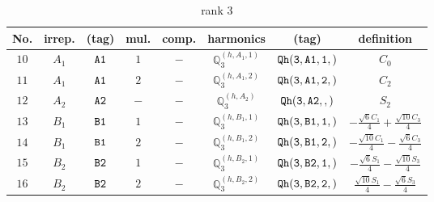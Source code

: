 \documentclass[fleqn,8pt]{jsarticle}
\begin{document}
\begin{table}[ht!]
\begin{center}
\caption{rank 3}
\renewcommand{\arraystretch}{1.3}
\begin{tabular}{cccccccc} \hline \hline
No. & irrep. & (tag) & mul. & comp. & harmonics & (tag) & definition \\ \hline
$ 10 $ & $ A_{1} $ & $ {\tt A1} $ & $ 1 $ & $ - $ & $ \mathbb{Q}_{3}^{(h,A_{1},1)} $ & $ {\tt Qh(3,A1,1,)} $ & $ C_{0} $ \\
$ 11 $ & $ A_{1} $ & $ {\tt A1} $ & $ 2 $ & $ - $ & $ \mathbb{Q}_{3}^{(h,A_{1},2)} $ & $ {\tt Qh(3,A1,2,)} $ & $ C_{2} $ \\
$ 12 $ & $ A_{2} $ & $ {\tt A2} $ & $ - $ & $ - $ & $ \mathbb{Q}_{3}^{(h,A_{2})} $ & $ {\tt Qh(3,A2,,)} $ & $ S_{2} $ \\
$ 13 $ & $ B_{1} $ & $ {\tt B1} $ & $ 1 $ & $ - $ & $ \mathbb{Q}_{3}^{(h,B_{1},1)} $ & $ {\tt Qh(3,B1,1,)} $ & $ - \frac{\sqrt{6} C_{1}}{4} + \frac{\sqrt{10} C_{3}}{4} $ \\
$ 14 $ & $ B_{1} $ & $ {\tt B1} $ & $ 2 $ & $ - $ & $ \mathbb{Q}_{3}^{(h,B_{1},2)} $ & $ {\tt Qh(3,B1,2,)} $ & $ - \frac{\sqrt{10} C_{1}}{4} - \frac{\sqrt{6} C_{3}}{4} $ \\
$ 15 $ & $ B_{2} $ & $ {\tt B2} $ & $ 1 $ & $ - $ & $ \mathbb{Q}_{3}^{(h,B_{2},1)} $ & $ {\tt Qh(3,B2,1,)} $ & $ - \frac{\sqrt{6} S_{1}}{4} - \frac{\sqrt{10} S_{3}}{4} $ \\
$ 16 $ & $ B_{2} $ & $ {\tt B2} $ & $ 2 $ & $ - $ & $ \mathbb{Q}_{3}^{(h,B_{2},2)} $ & $ {\tt Qh(3,B2,2,)} $ & $ \frac{\sqrt{10} S_{1}}{4} - \frac{\sqrt{6} S_{3}}{4} $ \\
 \hline \hline
\end{tabular}
\end{center}
\end{table}
\end{document}
